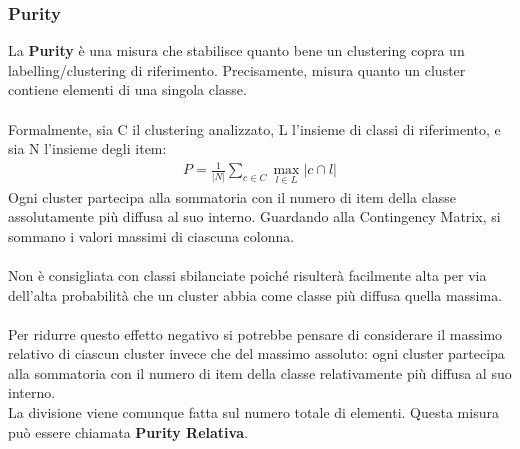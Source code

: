 \subsubsection{Purity}
La \textbf{Purity} è una misura che stabilisce quanto bene un clustering copra un labelling/clustering di riferimento. Precisamente, misura quanto un cluster contiene elementi di una singola classe.\\
\\
Formalmente, sia C il clustering analizzato, L l'insieme di classi di riferimento, e sia N l'insieme degli item:
\begin{align}
	P = \frac{1}{|N|}\sum_{c \in C}\max_{l \in L}|c \cap l|
\end{align}
Ogni cluster partecipa alla sommatoria con il numero di item della classe assolutamente più diffusa al suo interno. Guardando alla Contingency Matrix, si sommano i valori massimi di ciascuna colonna.\\
\\
Non è consigliata con classi sbilanciate poiché risulterà facilmente alta per via dell'alta probabilità che un cluster abbia come classe più diffusa quella massima.\\
\\
Per ridurre questo effetto negativo si potrebbe pensare di considerare il massimo relativo di ciascun cluster invece che del massimo assoluto: ogni cluster partecipa alla sommatoria con il numero di item della classe relativamente più diffusa al suo interno.\\
La divisione viene comunque fatta sul numero totale di elementi. Questa misura può essere chiamata \textbf{Purity Relativa}.

